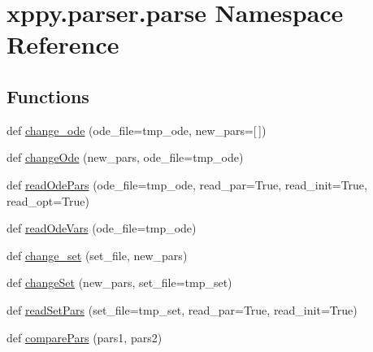 \hypertarget{namespacexppy_1_1parser_1_1parse}{}\section{xppy.\+parser.\+parse Namespace Reference}
\label{namespacexppy_1_1parser_1_1parse}
\subsection*{Functions}
\begin{DoxyCompactItemize}
\item 
def \mbox{\hyperlink{namespacexppy_1_1parser_1_1parse_aac794ef9d9e9168bb0286bdda25e5600}{change\+\_\+ode}} (ode\+\_\+file=tmp\+\_\+ode, new\+\_\+pars=\mbox{[}$\,$\mbox{]})
\item 
def \mbox{\hyperlink{namespacexppy_1_1parser_1_1parse_a655d9a7521dcd4ad6911e08b58f21095}{change\+Ode}} (new\+\_\+pars, ode\+\_\+file=tmp\+\_\+ode)
\item 
def \mbox{\hyperlink{namespacexppy_1_1parser_1_1parse_af0671dc23954132227d4cbf16e5c6c59}{read\+Ode\+Pars}} (ode\+\_\+file=tmp\+\_\+ode, read\+\_\+par=True, read\+\_\+init=True, read\+\_\+opt=True)
\item 
def \mbox{\hyperlink{namespacexppy_1_1parser_1_1parse_a1c00e53643ddf8a99e5bb8acec822b39}{read\+Ode\+Vars}} (ode\+\_\+file=tmp\+\_\+ode)
\item 
def \mbox{\hyperlink{namespacexppy_1_1parser_1_1parse_ae61c7e82ae565801f9facea020627023}{change\+\_\+set}} (set\+\_\+file, new\+\_\+pars)
\item 
def \mbox{\hyperlink{namespacexppy_1_1parser_1_1parse_af04c5b3924cc737b63d6266edc3642aa}{change\+Set}} (new\+\_\+pars, set\+\_\+file=tmp\+\_\+set)
\item 
def \mbox{\hyperlink{namespacexppy_1_1parser_1_1parse_a7852601fc25e28c32b4fe9747e29a629}{read\+Set\+Pars}} (set\+\_\+file=tmp\+\_\+set, read\+\_\+par=True, read\+\_\+init=True)
\item 
def \mbox{\hyperlink{namespacexppy_1_1parser_1_1parse_a14842f4006ba1a6ccd66af9b43857426}{compare\+Pars}} (pars1, pars2)
\end{DoxyCompactItemize}
